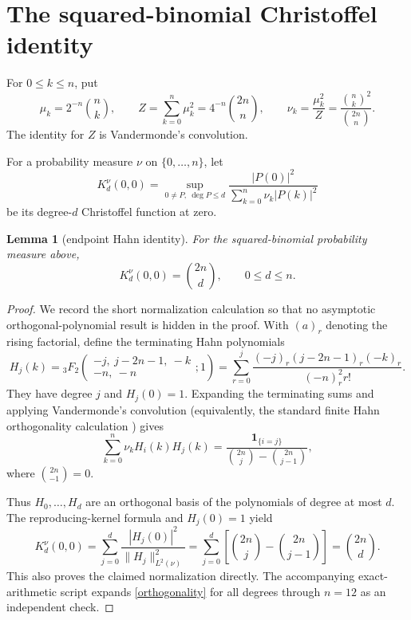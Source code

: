 \documentclass[11pt]{article}
\newtheorem{lemma}[theorem]{Lemma}
\begin{document}
\section{The squared-binomial Christoffel identity}

For $0\le k\le n$, put
\[
 \mu_k=2^{-n}\binom nk,
 \qquad
 Z=\sum_{k=0}^n\mu_k^2
   =4^{-n}\binom{2n}{n},
 \qquad
 \nu_k=\frac{\mu_k^2}{Z}
   =\frac{\binom nk^2}{\binom{2n}{n}}.
\]
The identity for $Z$ is Vandermonde's convolution.

For a probability measure $\nu$ on $\{0,\ldots,n\}$, let
\[
 K_d^\nu(0,0)=
 \sup_{0\ne P,\ \deg P\le d}
 \frac{|P(0)|^2}{\sum_{k=0}^n\nu_k|P(k)|^2}
\]
be its degree-$d$ Christoffel function at zero.

\begin{lemma}[endpoint Hahn identity]\label{hahn}
For the squared-binomial probability measure above,
\[
 K_d^\nu(0,0)=\binom{2n}{d},\qquad 0\le d\le n.
\]
\end{lemma}

\begin{proof}
We record the short normalization calculation so that no asymptotic
orthogonal-polynomial result is hidden in the proof.  With $(a)_r$ denoting
the rising factorial, define the terminating Hahn polynomials
\[
 H_j(k)={}_3F_2\!\left(
 \begin{matrix}-j,\ j-2n-1,\ -k\\-n,\ -n\end{matrix};1\right)
 =\sum_{r=0}^j
 \frac{(-j)_r(j-2n-1)_r(-k)_r}{(-n)_r^2r!}.
\]
They have degree $j$ and $H_j(0)=1$.  Expanding the terminating sums and
applying Vandermonde's convolution (equivalently, the standard finite Hahn
orthogonality calculation \cite[Sec.~9.5]{KLS}) gives
\begin{equation}\label{orthogonality}
 \sum_{k=0}^n\nu_k H_i(k)H_j(k)
 =\frac{\mathbf1_{\{i=j\}}}
 {\binom{2n}{j}-\binom{2n}{j-1}},
\end{equation}
where $\binom{2n}{-1}=0$.

Thus $H_0,\ldots,H_d$ are an orthogonal basis of the polynomials of degree
at most $d$.  The reproducing-kernel formula and $H_j(0)=1$ yield
\[
 K_d^\nu(0,0)
 =\sum_{j=0}^d\frac{|H_j(0)|^2}{\|H_j\|_{L^2(\nu)}^2}
 =\sum_{j=0}^d
 \left[\binom{2n}{j}-\binom{2n}{j-1}\right]
 =\binom{2n}{d}.
\]
This also proves the claimed normalization directly.  The accompanying
exact-arithmetic script expands \eqref{orthogonality} for all degrees through
$n=12$ as an independent check.
\end{proof}
\end{document}
